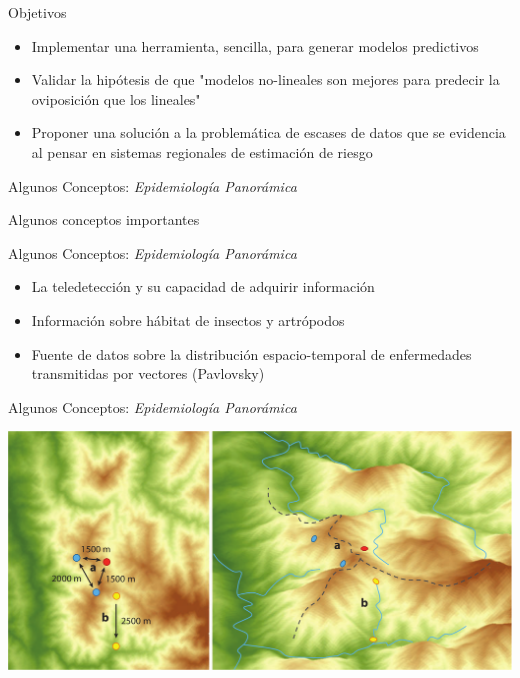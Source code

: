 \documentclass[10pt]{beamer}
\begin{document}
\begin{frame}{Objetivos}
  \pause
  \begin{itemize}[<+->]
   \item Implementar una herramienta, sencilla, para generar modelos predictivos
   \item Validar la hipótesis de que "modelos no-lineales son mejores para predecir la oviposición que los lineales"
   \item Proponer una solución a la problemática de escases de datos que se evidencia al pensar en sistemas regionales de estimación de riesgo

  \end{itemize}

\end{frame}


\begin{frame}{Algunos Conceptos: \textit{Epidemiología Panorámica}}
  \begin{center}
      Algunos conceptos importantes
  \end{center}

\end{frame}


\begin{frame}{Algunos Conceptos: \textit{Epidemiología Panorámica}}
  \pause
  \begin{itemize}[<+->]
   \item La teledetección y su capacidad de adquirir información
   \item Información sobre hábitat de insectos y artrópodos
   \item Fuente de datos sobre la distribución espacio-temporal de enfermedades
         transmitidas por vectores (Pavlovsky)
  \end{itemize}

\end{frame}


\begin{frame}{Algunos Conceptos: \textit{Epidemiología Panorámica}}
  \begin{center}
    \includegraphics[width=1\textwidth]{paisajes_heterogeneos}
  \end{center}
\end{frame}
\end{document}
